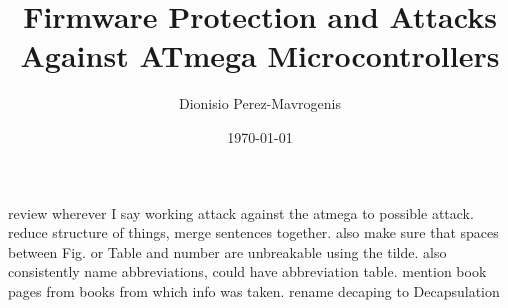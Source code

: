 \documentclass[10pt,journal,compsoc, a4paper]{IEEEtran}
\author{Dionisio Perez-Mavrogenis}
\title{Firmware Protection and Attacks Against ATmega Microcontrollers}
\date{\today}
\newcommand{\red}[1]{{\color{red} #1}}
\begin{document}
\maketitle
\IEEEdisplaynotcompsoctitleabstractindextext

\red{review wherever I say working attack against the atmega to possible attack. reduce structure of things, merge sentences together. also make sure that spaces between Fig. or Table and number are unbreakable using the tilde. also consistently name abbreviations, could have abbreviation table. mention book pages from books from which info was taken. rename decaping to Decapsulation }


	



	

{\footnotesize 	} %
\end{document}
